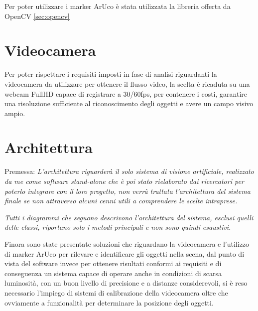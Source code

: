 \documentclass[12pt,a4paper,openright,twoside]{book}
\begin{document}
Per poter utilizzare i marker ArUco è stata utilizzata la libreria offerta da OpenCV \ref{sec:opencv}

\section{Videocamera}
Per poter rispettare i requisiti imposti in fase di analisi riguardanti la videocamera da utilizzare per ottenere il flusso video, la scelta è ricaduta su una webcam FullHD capace di registrare a 30/60fps, per contenere i costi, garantire una risoluzione sufficiente al riconoscimento degli oggetti e avere un campo visivo ampio.

\section{Architettura}
Premessa: \textit{L'architettura riguarderà il solo sistema di visione artificiale, realizzato da me come software stand-alone che è poi stato rielaborato dai ricercatori per poterlo integrare con il loro progetto, non verrà trattata l'architettura del sistema finale se non attraverso alcuni cenni utili a comprendere le scelte intraprese.}
\vspace{0.5cm}

\textit{Tutti i diagrammi che seguono descrivono l'architettura del sistema, esclusi quelli delle classi, riportano solo i metodi principali e non sono quindi esaustivi.}
\vspace{0.5cm}

\noindent Finora sono state presentate soluzioni che riguardano la videocamera e l'utilizzo di marker ArUco per rilevare e identificare gli oggetti nella \gls{scena}, dal punto di vista del software invece per ottenere risultati conformi ai requisiti e di conseguenza un sistema capace di operare anche in condizioni di scarsa luminosità, con un buon livello di precisione e a distanze considerevoli, si è reso necessario l'impiego di sistemi di calibrazione della videocamera oltre che ovviamente a funzionalità per determinare la posizione degli oggetti.
\end{document}
